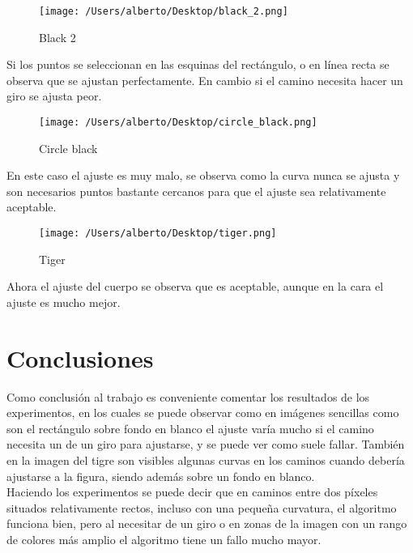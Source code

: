 \begin{figure}[H] %
\centering
\texttt{[image: /Users/alberto/Desktop/black\_2.png]}  %
\label{kk1}
\caption{Black 2} 
\end{figure}

Si los puntos se seleccionan en las esquinas del rectángulo, o en línea recta se observa que se ajustan perfectamente. En cambio si el camino necesita hacer un giro se ajusta peor.

\begin{figure}[H] %
\centering
\texttt{[image: /Users/alberto/Desktop/circle\_black.png]}  %
\label{kk1}
\caption{Circle black} 
\end{figure}

En este caso el ajuste es muy malo, se observa como la curva nunca se ajusta y son necesarios puntos bastante cercanos para que el ajuste sea relativamente aceptable.

\begin{figure}[H] %
\centering
\texttt{[image: /Users/alberto/Desktop/tiger.png]}  %
\label{kk1}
\caption{Tiger} 
\end{figure}

Ahora el ajuste del cuerpo se observa que es aceptable, aunque en la cara el ajuste es mucho mejor.

\section{Conclusiones}

Como conclusión al trabajo es conveniente comentar los resultados de los experimentos, en los cuales se puede observar como en imágenes sencillas como son el rectángulo sobre fondo en blanco el ajuste varía mucho si el camino necesita un de un giro para ajustarse, y se puede ver como suele fallar. También en la imagen del tigre son visibles algunas curvas en los caminos cuando debería ajustarse a la figura, siendo además sobre un fondo en blanco. \\

Haciendo los experimentos se puede decir que en caminos entre dos píxeles situados relativamente rectos, incluso con una pequeña curvatura, el algoritmo funciona bien, pero al necesitar de un giro o en zonas de la imagen con un rango de colores más amplio el algoritmo tiene un fallo mucho mayor.\\

